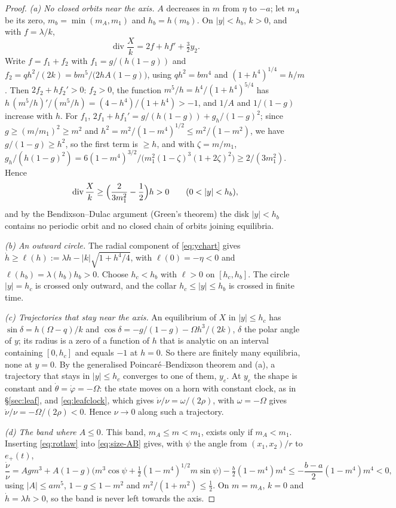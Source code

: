 \documentclass[11pt,reqno]{amsart}
\theoremstyle{plain}
\theoremstyle{definition}
\theoremstyle{remark}
\begin{document}
\begin{proof}
\emph{(a) No closed orbits near the axis.} $A$ decreases in $m$ from $\eta$ to $-a$; let $m_A$ be its zero,
$m_b=\min(m_A,m_1)$ and $h_b=h(m_b)$. On $|y|<h_b$, $k>0$, and with $f=\lambda/k$,
\[
  \operatorname{div}\frac{X}{k}=2f+hf'+\tfrac32y_2 .
\]
Write $f=f_1+f_2$ with $f_1=g/(h(1-g))$ and $f_2=qh^{2}/(2k)=bm^{5}/\bigl(2hA(1-g)\bigr)$, using $qh^{2}=bm^{4}$ and $(1+h^{4})^{1/4}=h/m$. Then $2f_2+hf_2'>0$: $f_2>0$, the function $m^{5}/h=h^{4}/(1+h^{4})^{5/4}$ has $h\,(m^{5}/h)'/(m^{5}/h)=(4-h^{4})/(1+h^{4})>-1$, and $1/A$ and $1/(1-g)$ increase with $h$. For $f_1$,
$2f_1+hf_1'=g/(h(1-g))+g_h/(1-g)^{2}$; since $g\ge(m/m_1)^{2}\ge m^{2}$ and $h^{2}=m^{2}/(1-m^{4})^{1/2}\le m^{2}/(1-m^{2})$, we have $g/(1-g)\ge h^{2}$, so the first term is
$\ge h$, and with $\zeta=m/m_1$,
$g_h/(h(1-g)^{2})=6(1-m^{4})^{3/2}/\bigl(m_1^{2}(1-\zeta)^{3}(1+2\zeta)^{2}\bigr)\ge2/(3m_1^{2})$. Hence
\[
  \operatorname{div}\frac{X}{k}\ge\Bigl(\frac{2}{3m_1^{2}}-\frac12\Bigr)h>0\qquad(0<|y|<h_b),
\]
and by the Bendixson--Dulac argument (Green's theorem) the disk $|y|<h_b$ contains no periodic orbit and no
closed chain of orbits joining equilibria.

\emph{(b) An outward circle.} The radial component of \eqref{eq:ychart} gives
$\dot h\ge\ell(h):=\lambda h-|k|\sqrt{1+h^{4}/4}$, with $\ell(0)=-\eta<0$ and $\ell(h_b)=\lambda(h_b)h_b>0$.
Choose $h_c<h_b$ with $\ell>0$ on $[h_c,h_b]$. The circle $|y|=h_c$ is crossed only outward, and the collar
$h_c\le|y|\le h_b$ is crossed in finite time.

\emph{(c) Trajectories that stay near the axis.} An equilibrium of $X$ in $|y|\le h_c$ has
$\sin\delta=h(\Omega-q)/k$ and $\cos\delta=-g/(1-g)-\Omega h^{3}/(2k)$, $\delta$ the polar angle of $y$;
its radius is a zero of a function of $h$ that is analytic on an interval containing $[0,h_c]$ and equals $-1$
at $h=0$. So there are finitely many equilibria, none at $y=0$. By the generalised Poincar\'e--Bendixson
theorem \cite[\S3.7]{Perko2001} and (a), a trajectory that stays in $|y|\le h_c$ converges to one of them,
$y_e$. At $y_e$ the shape is constant and $\dot\theta=\dot\varphi=-\Omega$: the state moves on a horn with
constant clock, as in \S\ref{sec:leaf}, and \eqref{eq:leafclock}, which gives $\dot\nu/\nu=\omega/(2\rho)$, with $\omega=-\Omega$
gives $\dot\nu/\nu=-\Omega/(2\rho)<0$. Hence $\nu\to0$ along such a trajectory.

\emph{(d) The band where $A\le0$.} This band, $m_A\le m<m_1$, exists only if $m_A<m_1$. Inserting
\eqref{eq:rotlaw} into \eqref{eq:size-AB} gives, with $\psi$ the angle from $(x_1,x_2)/r$ to $e_+(t)$,
\[
  \frac{\dot\nu}{\nu}=Ag m^{3}+A(1-g)\bigl(m^{3}\cos\psi+\tfrac12(1-m^{4})^{1/2}m\sin\psi\bigr)
  -\tfrac b2(1-m^{4})m^{4}\le-\frac{b-a}{2}(1-m^{4})m^{4}<0 ,
\]
using $|A|\le am^{5}$, $1-g\le1-m^{2}$ and $m^{2}/(1+m^{2})\le\frac12$. On $m=m_A$, $k=0$ and $\dot h=\lambda h>0$, so
the band is never left towards the axis.


\end{proof}
\end{document}
